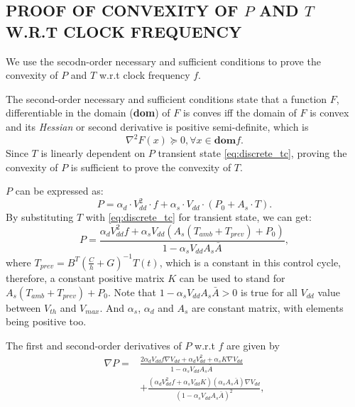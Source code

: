 \begin{appendices}
\section{PROOF OF CONVEXITY OF $P$ AND $T$ W.R.T CLOCK FREQUENCY}
We use the secodn-order necessary and sufficient conditions to prove the convexity of $P$ and $T$ w.r.t clock frequency $f$.

The second-order necessary and sufficient conditions state that a function $F$, differentiable in the domain (\textbf{dom}) of $F$ is conves iff the domain of $F$ is convex and its \textit{Hessian} or second derivative is positive semi-definite, which is
\begin{equation}\label{eq:hessian}
\nabla^{2}F(x) \succeq 0, \forall x \in \textbf{dom} f.
\end{equation}
Since $T$ is linearly dependent on $P$ transient state \eqref{eq:discrete_tc}, proving the convexity of $P$ is sufficient to prove the convexity of $T$.

$P$ can be expressed as:
\begin{equation}\label{eq:p_detail}
P =\alpha_{d}\cdot V_{dd}^{2} \cdot f+\alpha_{s}\cdot V_{dd} \cdot (P_{0}+A_{s} \cdot T).
\end{equation}
By substituting $T$ with \eqref{eq:discrete_tc} for transient state, we can get:
\begin{equation}\label{eq:p_transient}
P =\frac{\alpha_{d}V_{dd}^{2}f+\alpha_{s}V_{dd}(A_{s}(T_{amb}+T_{prev})+P_{0})}{1-\alpha_{s}V_{dd}A_{s}\bar{A}},
\end{equation}
where $T_{prev}=B^{T}(\frac{C}{h}+G)^{-1}T(t)$, which is a constant in this control cycle, therefore, a constant positive matrix $K$ can be used to stand for $A_{s}(T_{amb}+T_{prev})+P_{0}$. Note that $1-\alpha_{s}V_{dd}A_{s}\bar{A}>0$ is true for all $V_{dd}$ value between $V_{th}$ and $V_{max}$. And $\alpha_{s}$, $\alpha_{d}$ and $A_{s}$ are constant matrix, with elements being positive too.

The first and second-order derivatives of $P$ w.r.t $f$ are given by
\begin{equation}\label{eq:p_transient_d1}
\begin{split}
\nabla P =&\frac{2\alpha_{d}V_{dd}f\nabla V_{dd}+\alpha_{d}V_{dd}^{2}+\alpha_{s}K\nabla V_{dd}}{1-\alpha_{s}V_{dd}A_{s}\bar{A}}\\
&+\frac{(\alpha_{d}V_{dd}^{2}f+\alpha_{s}V_{dd}K)(\alpha_{s}A_{s}\bar{A})\nabla V_{dd} }{(1-\alpha_{s}V_{dd}A_{s}\bar{A})^{2}},
\end{split}
\end{equation}


\end{appendices}
